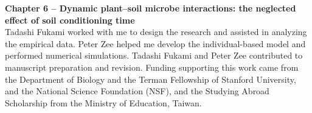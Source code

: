 \noindent \textbf{Chapter 6 -- Dynamic plant--soil microbe interactions: the neglected effect of soil conditioning time}\\
\noindent Tadashi Fukami worked with me to design the research and assisted in analyzing the empirical data. Peter Zee helped me develop the individual-based model and performed numerical simulations. Tadashi Fukami and Peter Zee contributed to manuscript preparation and revision. Funding supporting this work came from the Department of Biology and the Terman Fellowship of Stanford University, and the National Science Foundation (NSF), and the Studying Abroad Scholarship from the Ministry of Education, Taiwan.




